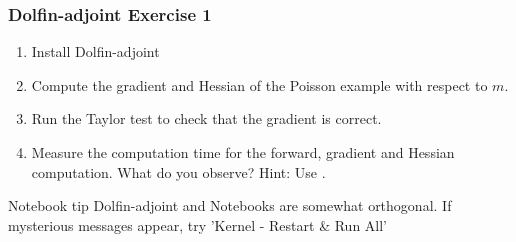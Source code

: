 \begin{frame}
    \frametitle{Dolfin-adjoint Exercise 1}
    \linespread{1.5}
    \begin{enumerate}
    \item
      Install Dolfin-adjoint
    \item Compute the gradient and Hessian of the Poisson example with respect to $m$.
    \item Run the Taylor test to check that the gradient is correct.
    \item Measure the computation time for the forward, gradient and Hessian computation. What do you observe? Hint: Use .
    \end{enumerate}

    \begin{block}{Notebook tip}
      Dolfin-adjoint and Notebooks are somewhat orthogonal. If
      mysterious messages appear, try 'Kernel - Restart \& Run All'
    \end{block}

\end{frame}

